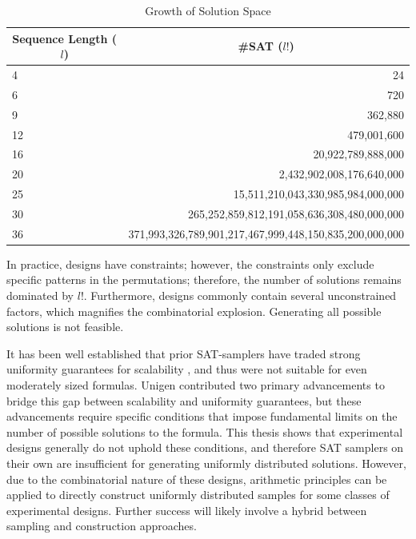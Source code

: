 \begin{table}[htb]
  \centering
  \caption{Growth of Solution Space}
\begin{tabular}{|l|r|}
\hline
\multicolumn{1}{|c|}{\textbf{Sequence Length ($l$)}} & \multicolumn{1}{c|}{\textbf{\#SAT ($l!$)}}              \\ \hline
4                                                    & 24                                                      \\ \hline
6                                                    & 720                                                     \\ \hline
9                                                    & 362,880                                                 \\ \hline
12                                                   & 479,001,600                                             \\ \hline
16                                                   & 20,922,789,888,000                                      \\ \hline
20                                                   & 2,432,902,008,176,640,000                               \\ \hline
25                                                   & 15,511,210,043,330,985,984,000,000                      \\ \hline
30                                                   & 265,252,859,812,191,058,636,308,480,000,000             \\ \hline
36                                                   & 371,993,326,789,901,217,467,999,448,150,835,200,000,000 \\ \hline
\end{tabular}
\label{tab:factorial_explosion}
\end{table}

In practice, designs have constraints; however, the constraints only exclude specific patterns in the permutations; therefore, the number of solutions remains dominated by $l!$. Furthermore, designs commonly contain several unconstrained factors, which magnifies the combinatorial explosion. Generating all possible solutions is not feasible.

It has been well established that prior SAT-samplers have traded strong uniformity guarantees for scalability \cite{chakraborty_balancing_2014}, and thus were not suitable for even moderately sized formulas. Unigen \cite{chakraborty_balancing_2014} contributed two primary advancements to bridge this gap between scalability and uniformity guarantees, but these advancements require specific conditions that impose fundamental limits on the number of possible solutions to the formula. This thesis shows that experimental designs generally do not uphold these conditions, and therefore SAT samplers on their own are insufficient for generating uniformly distributed solutions. However, due to the combinatorial nature of these designs, arithmetic principles can be applied to directly construct uniformly distributed samples for some classes of experimental designs. Further success will likely involve a hybrid between sampling and construction approaches.
